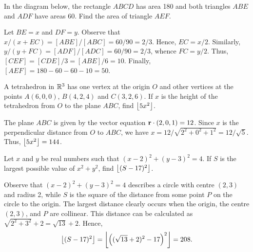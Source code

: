 \begin{question}[50]\label{A::2022-O-1-6}
    In the diagram below, the rectangle $ABCD$ has area 180 and both triangles $ABE$ and $ADF$ have areas 60. Find the area of triangle $AEF$.

    \begin{center}
    \end{center}
\end{question}
\begin{solution*}
    Let $BE = x$ and $DF = y$. Observe that $x/(x+EC) = [ABE]/[ABC] = 60/90 = 2/3$. Hence, $EC = x/2$. Similarly, $y/(y+FC) = [ADF]/[ADC] = 60/90 = 2/3$, whence $FC = y/2$. Thus, $[CEF] = [CDE]/3 = [ABE]/6 = 10$. Finally, $[AEF] = 180 - 60 - 60 - 10 = 50$.
\end{solution*}

\begin{question}[144]\label{A::2022-O-1-7}
    A tetrahedron in $\mathbb{R}^3$ has one vertex at the origin $O$ and other vertices at the points $A(6, 0, 0)$, $B(4, 2, 4)$ and $C(3, 2, 6)$. If $x$ is the height of the tetrahedron from $O$ to the plane $ABC$, find $\left\lfloor 5x^2 \right\rfloor$.
\end{question}
\begin{solution*}
    The plane $ABC$ is given by the vector equation $\mathbf{r} \cdot (2, 0, 1) = 12$. Since $x$ is the perpendicular distance from $O$ to $ABC$, we have $x = 12/{\sqrt{2^2 + 0^2 + 1^2}} = 12/\sqrt5$. Thus, $\left\lfloor 5x^2 \right\rfloor = 144$.
\end{solution*}

\begin{question}[208]\label{A::2022-O-1-8}
    Let $x$ and $y$ be real numbers such that $(x-2)^2 + (y-3)^2 = 4$. If $S$ is the largest possible value of $x^2 + y^2$, find $\left\lfloor (S-17)^2 \right\rfloor$.
\end{question}
\begin{solution*}
    Observe that $(x-2)^2 + (y-3)^2 = 4$ describes a circle with centre $(2, 3)$ and radius 2, while $S$ is the square of the distance from some point $P$ on the circle to the origin. The largest distance clearly occurs when the origin, the centre $(2, 3)$, and $P$ are collinear. This distance can be calculated as $\sqrt{2^2 + 3^2} + 2 = \sqrt{13} + 2$. Hence, \[\left\lfloor (S-17)^2 \right\rfloor = \left\lfloor \left( (\sqrt{13} + 2)^2 - 17 \right)^2 \right\rfloor = 208.\]
\end{solution*}

